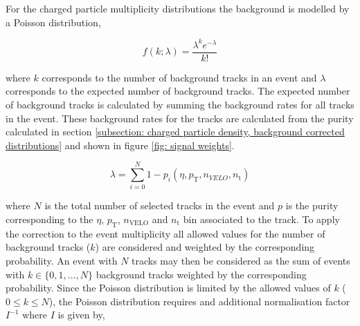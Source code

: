 

For the charged particle multiplicity distributions the background is modelled by a Poisson distribution,

\begin{equation*}
	f(k; \lambda) = \frac{\lambda^{k}e^{-\lambda}}{k!}
\end{equation*}

where $k$ corresponds to the number of background tracks in an event and $\lambda$ corresponds to the expected number of background tracks. The expected number of background tracks is calculated by summing the background rates for all tracks in the event. These background rates for the tracks are calculated from the purity calculated in section \ref{subsection: charged particle density, background corrected distributions} and shown in figure \ref{fig: signal weights}. 

\begin{equation}
	\lambda = \sum^{N}_{i=0} 1 - p_i(\eta, p_\mathrm{T}, n_{VELO}, n_\mathrm{t})
\end{equation}

where $N$ is the total number of selected tracks in the event and $p$ is the purity corresponding to the $\eta$, $p_\mathrm{T}$, $n_\mathrm{VELO}$ and $n_\mathrm{t}$ bin associated to the track. To apply the correction to the event multiplicity all allowed values for the number of background tracks ($k$) are considered and weighted by the corresponding probability. An event with $N$ tracks may then be considered as the sum of events with $k \in \{0, 1, ..., N\}$ background tracks weighted by the corresponding probability. Since the Poisson distribution is limited by the allowed values of $k$ ($0 \le k \le N$), the Poisson distribution requires and additional normalisation factor $I^{-1}$ where $I$ is given by, 

